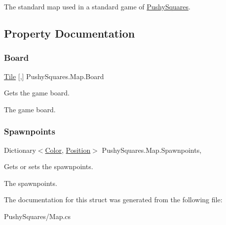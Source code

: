 The standard map used in a standard game of \hyperlink{namespace_pushy_squares}{Pushy\+Squares}. 



\subsection{Property Documentation}
\mbox{\label{struct_pushy_squares_1_1_map_a3c11187234afb489b5a30f4c32cd1a14}} 
\subsubsection{\texorpdfstring{Board}{Board}}
{\footnotesize\ttfamily \hyperlink{namespace_pushy_squares_a99b558ed55fb7c5c20e9fe37c652132c}{Tile} \mbox{[},\mbox{]} Pushy\+Squares.\+Map.\+Board\hspace{0.3cm}{\ttfamily [get]}}



Gets the game board. 

The game board.\mbox{\label{struct_pushy_squares_1_1_map_a72e3082cfaee94b86c3a1b02f5bda0e9}} 
\subsubsection{\texorpdfstring{Spawnpoints}{Spawnpoints}}
{\footnotesize\ttfamily Dictionary$<$\hyperlink{namespace_pushy_squares_a456c990da0c8e2089c171d31f7e27574}{Color}, \hyperlink{struct_pushy_squares_1_1_position}{Position}$>$ Pushy\+Squares.\+Map.\+Spawnpoints\hspace{0.3cm}{\ttfamily [get]}, {\ttfamily [set]}}



Gets or sets the spawnpoints. 

The spawnpoints.

The documentation for this struct was generated from the following file\+:\begin{DoxyCompactItemize}
\item 
Pushy\+Squares/Map.\+cs\end{DoxyCompactItemize}
